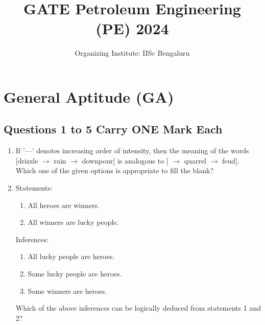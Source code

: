\documentclass[journal,12pt,onecolumn]{IEEEtran}
\title{GATE Petroleum Engineering (PE) 2024}
\author{Organizing Institute: IISc Bengaluru}
\date{}
\theoremstyle{remark}
\begin{document}
\maketitle

\section*{General Aptitude (GA)}

\subsection*{Questions 1 to 5 Carry ONE Mark Each}
\begin{enumerate}
\item If '---' denotes increasing order of intensity, then the meaning of the words [drizzle $\rightarrow$ rain $\rightarrow$ downpour] is analogous to [\underline{\hspace{1.5cm}} $\rightarrow$ quarrel $\rightarrow$ feud]. Which one of the given options is appropriate to fill the blank?
\begin{enumerate}
\end{enumerate}
\hfill{}


\item  Statements: 
\begin{enumerate}
    \item All heroes are winners.
    \item All winners are lucky people.
\end{enumerate}
Inferences:
\begin{enumerate}[label=(\Roman*)]
    \item All lucky people are heroes.
    \item Some lucky people are heroes.
    \item Some winners are heroes.
\end{enumerate}
Which of the above inferences can be logically deduced from statements 1 and 2?
\begin{enumerate}
\end{enumerate}
\hfill{}




\end{enumerate}
\end{document}

